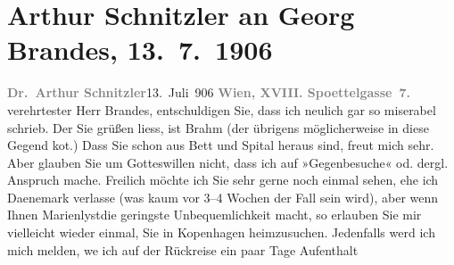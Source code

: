 

               \section[Arthur Schnitzler an Georg Brandes, 13. 7. 1906]{ Arthur Schnitzler an Georg Brandes, 13. 7. 1906}\nopagebreak{}\rehead{ }\begin{ledgroupsized}[t]{13cm}\normalsize\beginnumbering{} \toendnotes[C]{\smallbreak\pagebreak[2]} 
\pstart
           \noindent{}{\pb}\textcolor{gray}{\textbf{Dr. Arthur Schnitzler}}\hfill 13. Juli 906\pend
           \pstart
           \textcolor{gray}{\textbf{Wien, XVIII. Spoettelgasse 7.}}\pend
           \pstart{}verehrtester Herr Brandes,\pend\pstart
           entschuldigen Sie, dass ich neulich gar so miserabel schrieb. Der Sie grüßen
                    liess, ist Brahm (der übrigens
                    möglicherweise in diese Gegend ko{\geminationm}t.) Dass Sie
                    schon aus Bett und Spital heraus sind, freut mich sehr. Aber glauben Sie um
                    Gotteswillen nicht, dass ich auf »Gegenbesuche« od. dergl. Anspruch mache.
                    Freilich möchte ich Sie sehr gerne noch einmal sehen, ehe ich Daenemark verlasse (was kaum vor 3–4 Wochen der Fall sein
                    wird), aber wenn Ihnen Marienlystdie geringste Unbequemlichkeit macht, so
                    erlauben Sie mir vielleicht wieder einmal, Sie in Kopenhagen heimzusuchen. Jedenfalls werd ich mich melden, we{\geminationn} ich auf der Rückreise ein paar Tage Aufenthalt

\end{ledgroupsized}
